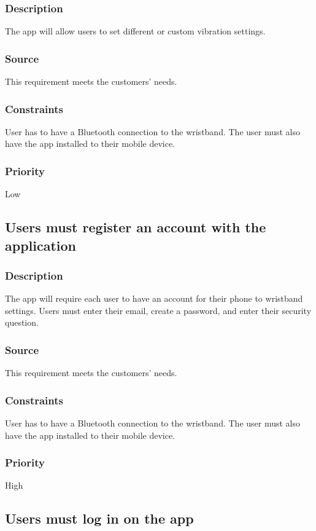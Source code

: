 \subsubsection{Description}
The app will allow users to set different or custom vibration settings.
\subsubsection{Source}
This requirement meets the customers' needs.
\subsubsection{Constraints}
User has to have a Bluetooth connection to the wristband. The user must also have the app installed to their mobile device.
\subsubsection{Priority}
Low

\subsection{Users must register an account with the application}
\subsubsection{Description}
The app will require each user to have an account for their phone to wristband settings. Users must enter their email, create a password, and enter their security question.
\subsubsection{Source}
This requirement meets the customers' needs.
\subsubsection{Constraints}
User has to have a Bluetooth connection to the wristband. The user must also have the app installed to their mobile device.
\subsubsection{Priority}
High

\subsection{Users must log in on the app}
